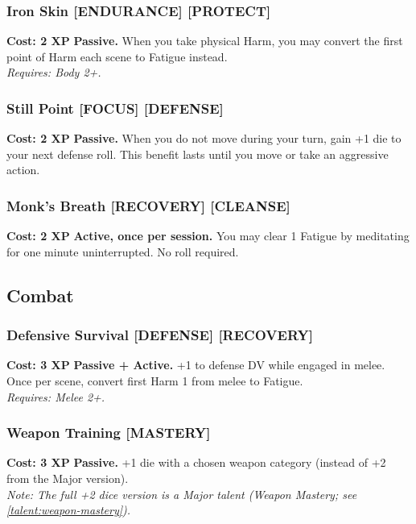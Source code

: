 \documentclass[12pt,a4paper]{book}
\begin{document}
\subsubsection*{Iron Skin \textnormal{[ENDURANCE] [PROTECT]}}
\label{talent:iron-skin}
\textbf{Cost: 2 XP} \textbf{Passive.} When you take physical Harm, you may convert the first point of Harm each scene to Fatigue instead. \\
\textit{Requires: Body 2+.}

\subsubsection*{Still Point \textnormal{[FOCUS] [DEFENSE]}}
\label{talent:still-point}
\textbf{Cost: 2 XP} \textbf{Passive.} When you do not move during your turn, gain +1 die to your next defense roll. This benefit lasts until you move or take an aggressive action.

\subsubsection*{Monk's Breath \textnormal{[RECOVERY] [CLEANSE]}}
\label{talent:monks-breath}
\textbf{Cost: 2 XP} \textbf{Active, once per session.} You may clear 1 Fatigue by meditating for one minute uninterrupted. No roll required.

\subsection*{Combat}
\label{sec:minor-combat}

\subsubsection*{Defensive Survival \textnormal{[DEFENSE] [RECOVERY]}}
\label{talent:defensive-survival}
\textbf{Cost: 3 XP} \textbf{Passive + Active.} +1 to defense DV while engaged in melee. Once per scene, convert first Harm 1 from melee to Fatigue. \\
\textit{Requires: Melee 2+.}

\subsubsection*{Weapon Training \textnormal{[MASTERY]}}
\label{talent:weapon-training}
\textbf{Cost: 3 XP} \textbf{Passive.} +1 die with a chosen weapon category (instead of +2 from the Major version). \\
\textit{Note: The full +2 dice version is a Major talent (Weapon Mastery; see \ref{talent:weapon-mastery}).}
\end{document}
